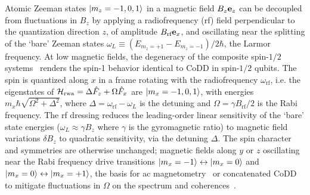 \documentclass[aps,prl,reprint,superscriptaddress,floatfix]{revtex4-1}
\begin{document}

Atomic Zeeman states $\vert m_z=-1,0,1 \rangle $ in a magnetic field $B_z \mathbf{e}_z$ can be decoupled from fluctuations in $B_z$ by applying a radiofrequency (rf) field perpendicular to the quantization direction $z$, of amplitude $B_{\text{rf}} \mathbf{e}_x$, and oscillating near the splitting of the `bare' Zeeman states $\omega_L \equiv (E_{m_z=+1}-E_{m_z=-1})/2\hbar$, the Larmor frequency.
At low magnetic fields, the degeneracy of the composite spin-$1/2$ systems~\cite{majorana_atomi_1932} renders the spin-1 behavior identical to CoDD in spin-$1/2$ qubits.
The spin is quantized along $x$ in a frame rotating with the radiofrequency $\omega_{\text{rf}}$, i.e. the eigenstates of $\mathcal{H}_{\text{rwa}} = \Delta \hat{F}_z + \Omega \hat{F}_x$ are $\vert m_x=-1,0,1 \rangle $, with energies $m_x \hbar \sqrt{\Omega^2 + \Delta^2}$, where $\Delta = \omega_{\text{rf}}-\omega_L$ is the detuning and $\Omega = \gamma B_{\text{rf}} / 2$ is the Rabi frequency.
The rf dressing reduces the leading-order linear sensitivity of the `bare' state energies ($\omega_L \approx \gamma B_z$ where $\gamma$ is the gyromagnetic ratio) to magnetic field variations $\delta B_z$ to quadratic sensitivity, via the detuning $\Delta$.
The spin character and symmetries are otherwise unchanged; magnetic fields along $y$ or $z$ oscillating near the Rabi frequency drive transitions $\vert m_x=-1 \rangle  \leftrightarrow \vert m_x=0 \rangle $ and $\vert m_x=0 \rangle  \leftrightarrow \vert m_x=+1 \rangle $, the basis for ac magnetometry~\cite{hirose_continuous_2012} or concatenated CoDD to mitigate fluctuations in $\Omega$ on the spectrum and coherences~\cite{cai_robust_2012}.
\end{document}
